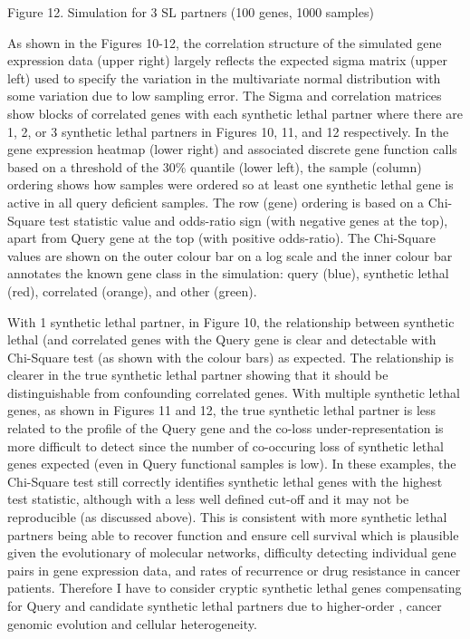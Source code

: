 Figure 12.  Simulation for 3 SL partners (100 genes, 1000 samples)

As shown in the Figures 10-12, the correlation structure of the simulated \gls{gene expression} data (upper right) largely reflects the expected sigma matrix (upper left) used to specify the variation in the multivariate normal distribution with some variation due to low sampling error.  The Sigma and correlation matrices show blocks of correlated genes with each \gls{synthetic lethal} partner where there are 1, 2, or 3 \gls{synthetic lethal} partners in Figures 10, 11, and 12 respectively.  In the \gls{gene expression} heatmap (lower right) and associated discrete gene function calls based on a threshold of the 30\% quantile (lower left), the sample (column) ordering shows how samples were ordered so at least one \gls{synthetic lethal} gene is active in all query deficient samples.  The row (gene) ordering is based on a Chi-Square test statistic value and odds-ratio sign (with negative genes at the top), apart from Query gene at the top (with positive odds-ratio).  The Chi-Square values are shown on the outer colour bar on a log scale and the inner colour bar annotates the known gene class in the simulation: query (blue), \gls{synthetic lethal} (red), correlated (orange), and other (green).

With 1 \gls{synthetic lethal} partner, in Figure 10, the relationship between \gls{synthetic lethal} (and correlated genes with the Query gene is clear and detectable with Chi-Square test (as shown with the colour bars) as expected.  The relationship is clearer in the true \gls{synthetic lethal} partner showing that it should be distinguishable from confounding correlated genes.  With multiple \gls{synthetic lethal} genes, as shown in Figures 11 and 12, the true \gls{synthetic lethal} partner is less related to the  profile of the Query gene and the co-loss under-representation is more difficult to detect since the number of co-occuring loss of \gls{synthetic lethal} genes expected (even in Query functional samples is low).  In these examples, the Chi-Square test still correctly identifies \gls{synthetic lethal} genes with the highest test statistic, although with a less well defined cut-off and it may not be reproducible (as discussed above).  This is consistent with more \gls{synthetic lethal} partners being able to recover function and ensure cell survival which is plausible given the evolutionary  of molecular networks, difficulty detecting individual gene pairs in \gls{gene expression} data, and rates of recurrence or drug resistance in cancer patients.  Therefore I have to consider cryptic \gls{synthetic lethal} genes compensating for Query and candidate \gls{synthetic lethal} partners due to higher-order , cancer \gls{genomic} evolution and cellular heterogeneity.

